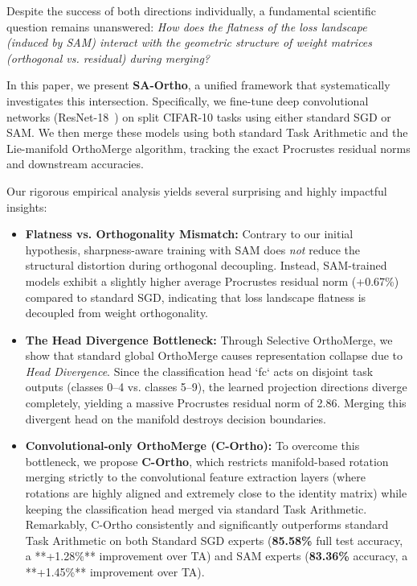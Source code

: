 \documentclass{article}
\begin{document}
Despite the success of both directions individually, a fundamental scientific question remains unanswered: \emph{How does the flatness of the loss landscape (induced by SAM) interact with the geometric structure of weight matrices (orthogonal vs. residual) during merging?}

In this paper, we present \textbf{SA-Ortho}, a unified framework that systematically investigates this intersection. 
Specifically, we fine-tune deep convolutional networks (ResNet-18~\cite{he2016deep}) on split CIFAR-10 tasks using either standard SGD or SAM. 
We then merge these models using both standard Task Arithmetic and the Lie-manifold OrthoMerge algorithm, tracking the exact Procrustes residual norms and downstream accuracies.

Our rigorous empirical analysis yields several surprising and highly impactful insights:
\begin{itemize}
    \item \textbf{Flatness vs. Orthogonality Mismatch:} Contrary to our initial hypothesis, sharpness-aware training with SAM does \emph{not} reduce the structural distortion during orthogonal decoupling. Instead, SAM-trained models exhibit a slightly higher average Procrustes residual norm (+0.67\%) compared to standard SGD, indicating that loss landscape flatness is decoupled from weight orthogonality.
    \item \textbf{The Head Divergence Bottleneck:} Through Selective OrthoMerge, we show that standard global OrthoMerge causes representation collapse due to \emph{Head Divergence}. Since the classification head `fc` acts on disjoint task outputs (classes 0--4 vs. classes 5--9), the learned projection directions diverge completely, yielding a massive Procrustes residual norm of 2.86. Merging this divergent head on the manifold destroys decision boundaries.
    \item \textbf{Convolutional-only OrthoMerge (C-Ortho):} To overcome this bottleneck, we propose \textbf{C-Ortho}, which restricts manifold-based rotation merging strictly to the convolutional feature extraction layers (where rotations are highly aligned and extremely close to the identity matrix) while keeping the classification head merged via standard Task Arithmetic. Remarkably, C-Ortho consistently and significantly outperforms standard Task Arithmetic on both Standard SGD experts (\textbf{85.58\%} full test accuracy, a **+1.28\%** improvement over TA) and SAM experts (\textbf{83.36\%} accuracy, a **+1.45\%** improvement over TA).
\end{itemize}
\end{document}

